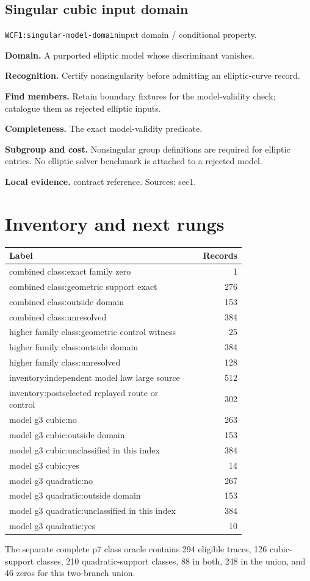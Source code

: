 \documentclass[10pt]{article}
\begin{document}
\subsection{Singular cubic input domain}
\texttt{WCF1:singular-model-domain}\quad input domain / conditional property.\par
\textbf{Domain.} A purported elliptic model whose discriminant vanishes.\par
\textbf{Recognition.} Certify nonsingularity before admitting an elliptic-curve record.\par
\textbf{Find members.} Retain boundary fixtures for the model-validity check; catalogue them as rejected elliptic inputs.\par
\textbf{Completeness.} The exact model-validity predicate.\par
\textbf{Subgroup and cost.} Nonsingular group definitions are required for elliptic entries. No elliptic solver benchmark is attached to a rejected model.\par
\textbf{Local evidence.} contract reference. Sources: sec1.
\section{Inventory and next rungs}
\begin{longtable}{p{0.77\linewidth}r}\toprule Label & Records\\\midrule\endhead
combined class:exact family zero & 1\\
combined class:geometric support exact & 276\\
combined class:outside domain & 153\\
combined class:unresolved & 384\\
higher family class:geometric control witness & 25\\
higher family class:outside domain & 384\\
higher family class:unresolved & 128\\
inventory:independent model law large source & 512\\
inventory:postselected replayed route or control & 302\\
model g3 cubic:no & 263\\
model g3 cubic:outside domain & 153\\
model g3 cubic:unclassified in this index & 384\\
model g3 cubic:yes & 14\\
model g3 quadratic:no & 267\\
model g3 quadratic:outside domain & 153\\
model g3 quadratic:unclassified in this index & 384\\
model g3 quadratic:yes & 10\\
\bottomrule\end{longtable}
The separate complete p7 class oracle contains 294 eligible traces, 126 cubic-support classes, 210 quadratic-support classes, 88 in both, 248 in the union, and 46 zeros for this two-branch union.
\end{document}
